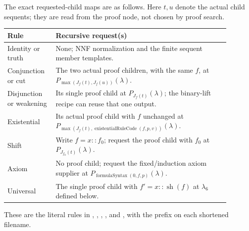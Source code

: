 The exact requested-child maps are as follows.  Here $t,u$ denote
the actual child sequents; they are read from the proof node, not
chosen by proof search.
\begin{center}\small
\begin{tabular}{p{0.18\linewidth}p{0.71\linewidth}}
Rule & Recursive request(s)\\ \hline
Identity or truth & None; NNF normalization and the finite sequent member templates.\\
Conjunction or cut & The two actual proof children, with the same $f$, at $P_{\max(J_f(t),J_f(u))}(\lambda)$.\\
Disjunction or weakening & Its single proof child at $P_{J_f(t)}(\lambda)$; the binary-lift recipe can reuse that one output.\\
Existential & Its actual proof child with $f$ unchanged at $P_{\max(J_f(t),\operatorname{existentialRuleCode}(f,p,v))}(\lambda)$.\\
Shift & Write $f=x::f_0$; request the proof child with $f_0$ at $P_{J_{f_0}(t)}(\lambda)$.\\
Axiom & No proof child; request the fixed/induction axiom supplier at $P_{\operatorname{formulaSyntax}(0,f,p)}(\lambda)$.\\
Universal & The single proof child with $f'=x::\operatorname{sh}(f)$ at $\lambda_6$ defined below.\\
\end{tabular}
\end{center}
These are the literal rules in
,
, ,
, and , with the prefix
 on each shortened filename.

